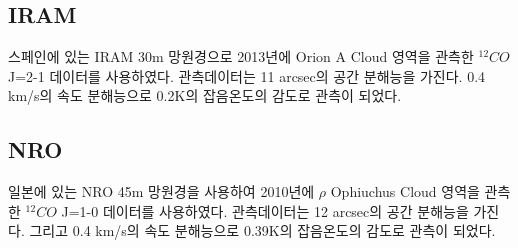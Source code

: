 \subsection{IRAM}
스페인에 있는 IRAM 30m 망원경으로 2013년에 Orion A Cloud 영역을 관측한 $^{12}CO$ J=2-1 데이터를 사용하였다. 관측데이터는 11 arcsec의 공간 분해능을 가진다. 0.4 km/s의 속도 분해능으로 0.2K의 잡음온도의 감도로 관측이 되었다.\cite{Berne}


\subsection{NRO}
일본에 있는 NRO 45m 망원경을 사용하여 2010년에 $\rho$ Ophiuchus Cloud 영역을 관측한 $^{12}CO$ J=1-0 데이터를 사용하였다. 관측데이터는 12 arcsec의 공간 분해능을 가진다. 그리고 0.4 km/s의 속도 분해능으로 0.39K의 잡음온도의 감도로 관측이 되었다.\cite{Hatchell2}
